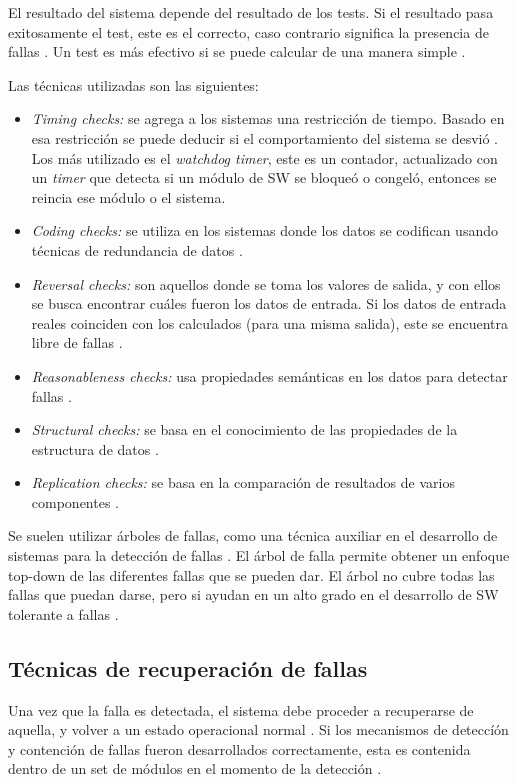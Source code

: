 El resultado del sistema depende del resultado de los tests. Si el resultado pasa exitosamente el 
test, este es el correcto, caso contrario significa la presencia de fallas \citep{FTDesign}. Un test 
es más efectivo si se puede calcular de una manera simple \citep{FTDesign}. 

Las técnicas utilizadas son las siguientes:
\begin{itemize}
 \item \textit{Timing checks:} se agrega a los sistemas una restricción de tiempo. Basado en esa 
restricción se puede deducir si el comportamiento del sistema se desvió \citep{FTDesign}. Los más 
utilizado es el \textit{watchdog timer}, este es un contador, actualizado con un \textit{timer} que 
detecta si un módulo de \ac{SW} se bloqueó o congeló, entonces se reincia ese módulo o el sistema. 
 \item \textit{Coding checks:} se utiliza en los sistemas donde los datos se codifican usando 
técnicas de redundancia de datos \citep{FTDesign}. 
 \item \textit{Reversal checks:} son aquellos donde se toma los valores de salida, y con ellos se 
busca encontrar cuáles fueron los datos de entrada. Si los datos de entrada reales coinciden con 
los calculados (para una misma salida), este se encuentra libre de fallas \citep{FTDesign}. 
 \item \textit{Reasonableness checks:} usa propiedades semánticas en los datos para detectar 
fallas \citep{FTDesign}. 
 \item \textit{Structural checks:} se basa en el conocimiento de las propiedades de la estructura 
de datos \citep{FTDesign}. 
 \item \textit{Replication checks: } se basa en la comparación de resultados de varios componentes 
\citep{SoftwareFaultToleranceATutorial}. 
\end{itemize}

Se suelen utilizar árboles de fallas, como una técnica auxiliar en el desarrollo de sistemas para 
la detección de fallas \citep{SoftwareFaultToleranceATutorial}. El árbol de falla permite obtener 
un enfoque top-down de las diferentes fallas que se pueden dar. El árbol no cubre todas las fallas 
que puedan darse, pero si ayudan en un alto grado en el desarrollo de \ac{SW} tolerante a fallas 
\citep{SoftwareFaultToleranceATutorial}. 

\subsection{Técnicas de recuperación de fallas}
Una vez que la falla es detectada, el sistema debe proceder a recuperarse de aquella, y volver a 
un estado operacional normal \citep{FTDesign}. Si los mecanismos de deteccíón y contención de 
fallas fueron desarrollados correctamente, esta es contenida dentro de un set de módulos en el 
momento de la detección \citep{FTDesign}. 


